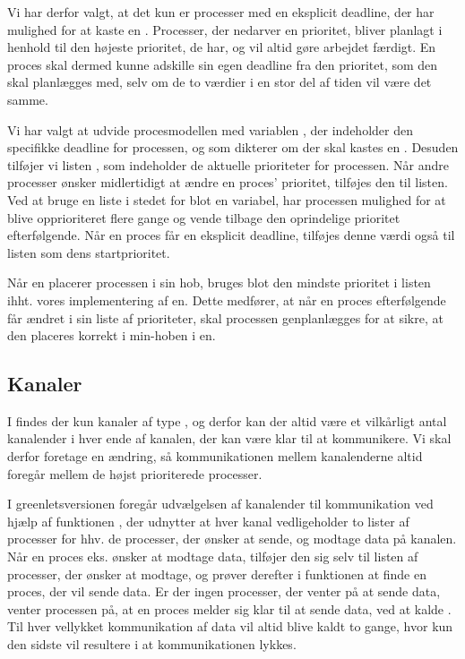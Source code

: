 Vi har derfor valgt, at det kun er processer med en eksplicit deadline, der har mulighed for at kaste en . Processer, der nedarver en prioritet, bliver planlagt i henhold til den højeste prioritet, de har, og vil altid  gøre arbejdet færdigt. En proces skal dermed kunne adskille sin egen deadline fra den prioritet, som den skal planlægges med, selv om de to værdier i en stor del af tiden vil være det samme.

Vi har valgt at udvide procesmodellen med variablen , der indeholder den specifikke deadline for processen, og som dikterer om der skal kastes en 
. Desuden tilføjer vi listen , som indeholder de aktuelle prioriteter for processen. Når andre processer ønsker midlertidigt at ændre en proces' prioritet, tilføjes den til listen. Ved at bruge en liste i stedet for blot en variabel, har processen mulighed for at blive opprioriteret flere gange og vende tilbage den oprindelige prioritet efterfølgende. Når en proces får en eksplicit deadline, tilføjes denne værdi også til listen som dens startprioritet. 

Når \sched en placerer processen i sin hob, bruges blot den mindste prioritet i listen ihht. vores implementering af \sched en. Dette medfører, at når en proces efterfølgende  får ændret i sin liste af prioriteter, skal processen genplanlægges for at sikre, at den placeres korrekt i min-hoben i \sched en. 

\subsection{Kanaler}
I \pycsp findes der kun kanaler af type , og derfor kan der altid  være et vilkårligt antal kanalender i hver ende af kanalen, der kan være klar til at kommunikere. Vi skal derfor foretage en ændring, så kommunikationen mellem kanalenderne altid foregår mellem de højst prioriterede processer. 

I greenletsversionen foregår udvælgelsen af kanalender til kommunikation ved hjælp af funktionen , der udnytter at  hver kanal vedligeholder to lister af processer for hhv. de processer, der ønsker at sende, og modtage data på kanalen. Når en proces eks. ønsker at modtage data, tilføjer den sig selv til listen af processer, der ønsker at modtage, og prøver derefter i  funktionen at finde en proces, der vil sende data. Er der ingen processer, der venter på at sende data, venter processen på, at en proces melder sig klar til at sende data, ved at kalde . Til hver vellykket kommunikation af data vil  altid blive kaldt to gange, hvor kun den sidste vil resultere i at kommunikationen lykkes.

